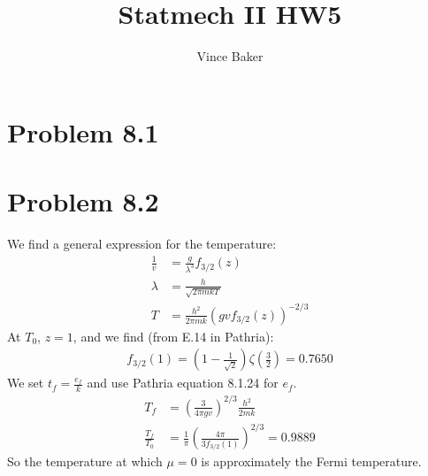 \documentclass[a4paper,11pt]{article}
\title{Statmech II HW5}
\author{Vince Baker}
\numberwithin{equation}{section}
\begin{document}
\maketitle

\section{Problem 8.1}
\section{Problem 8.2}
We find a general expression for the temperature:
\begin{align}
 \frac{1}{v} &= \frac{g}{\lambda^3}f_{3/2}(z)\\
 \lambda &= \frac{h}{\sqrt{2\pi mkT}}\\
 T &= \frac{h^2}{2\pi mk}\left(gvf_{3/2}(z) \right)^{-2/3}
\end{align}
At $T_0$, $z=1$, and we find (from E.14 in Pathria):
\begin{align}
 f_{3/2}(1) = (1-\frac{1}{\sqrt{2}})\zeta (\frac{3}{2}) = 0.7650
\end{align}
We set $t_f=\frac{e_f}{k}$ and use Pathria equation 8.1.24 for $e_f$. 
\begin{align}
 T_f &= \left(\frac{3}{4\pi gv} \right)^{2/3}\frac{h^2}{2mk}\\
 \frac{T_f}{T_0} &= \frac{1}{\pi}\left(\frac{4\pi}{3f_{3/2}(1)} \right)^{2/3} = 0. 9889
\end{align}
So the temperature at which $\mu =0$ is approximately the Fermi temperature.
\\ \\
\end{document}
